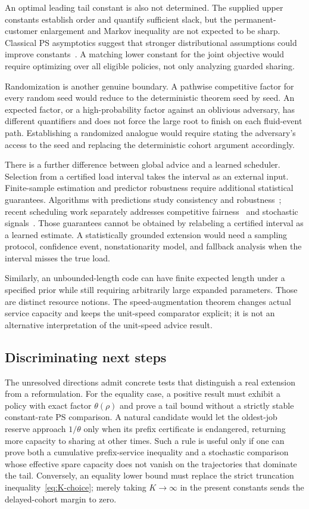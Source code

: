 An optimal leading tail constant is also not determined. The supplied upper constants establish order and quantify sufficient slack, but the permanent-customer enlargement and Markov inequality are not expected to be sharp. Classical PS asymptotics suggest that stronger distributional assumptions could improve constants~\cite{yashkov1987,zwartboxma2000,borst2006}. A matching lower constant for the joint objective would require optimizing over all eligible policies, not only analyzing guarded sharing.

Randomization is another genuine boundary.  A pathwise competitive factor for every random seed would reduce to the deterministic theorem seed by seed.  An expected factor, or a high-probability factor against an oblivious adversary, has different quantifiers and does not force the large root to finish on each fluid-event path.  Establishing a randomized analogue would require stating the adversary's access to the seed and replacing the deterministic cohort argument accordingly.

There is a further difference between global advice and a learned scheduler. Selection from a certified load interval takes the interval as an external input. Finite-sample estimation and predictor robustness require additional statistical guarantees. Algorithms with predictions study consistency and robustness~\cite{purohit2018,mitzenmacher2022}; recent scheduling work separately addresses competitive fairness~\cite{li2025} and stochastic signals~\cite{cosson2026}. Those guarantees cannot be obtained by relabeling a certified interval as a learned estimate. A statistically grounded extension would need a sampling protocol, confidence event, nonstationarity model, and fallback analysis when the interval misses the true load.

Similarly, an unbounded-length code can have finite expected length under a specified prior while still requiring arbitrarily large expanded parameters. Those are distinct resource notions. The speed-augmentation theorem changes actual service capacity and keeps the unit-speed comparator explicit; it is not an alternative interpretation of the unit-speed advice result.

\subsection{Discriminating next steps}\label{sec:next-steps}
The unresolved directions admit concrete tests that distinguish a real extension from a reformulation.  For the equality case, a positive result must exhibit a policy with exact factor $\theta(\rho)$ and prove a tail bound without a strictly stable constant-rate PS comparison.  A natural candidate would let the oldest-job reserve approach $1/\theta$ only when its prefix certificate is endangered, returning more capacity to sharing at other times.  Such a rule is useful only if one can prove both a cumulative prefix-service inequality and a stochastic comparison whose effective spare capacity does not vanish on the trajectories that dominate the tail.  Conversely, an equality lower bound must replace the strict truncation inequality~\eqref{eq:K-choice}; merely taking $K\to\infty$ in the present constants sends the delayed-cohort margin to zero.

